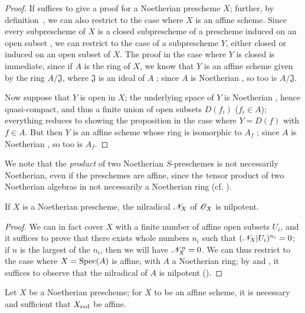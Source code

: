 \begin{proof}
\label{proof-1.6.1.4}
If suffices to give a proof for a Noetherian prescheme $X$;
further, by definition~, we can also restrict to the case where $X$ is an affine scheme.
Since every subprescheme of $X$ is a closed subprescheme of a prescheme induced on an open subset , we can restrict to the case of a subprescheme $Y$, either closed or induced on an open subset of $X$.
The proof in the case where $Y$ is closed is immediate, since if $A$ is the ring of $X$, we know that $Y$ is an affine scheme given by the ring $A/\mathfrak{J}$, where $\mathfrak{J}$ is an ideal of $A$ ;
since $A$ is Noetherian , so too is $A/\mathfrak{J}$.

Now suppose that $Y$ is open in $X$;
the underlying space of $Y$ is Noetherian , hence quasi-compact, and thus a finite union of open subsets $D(f_i)$ ($f_i\in A$);
everything reduces to showing the proposition in the case where $Y=D(f)$ with $f\in A$.
But then $Y$ is an affine scheme whose ring is isomorphic to $A_f$ ;
since $A$ is Noetherian , so too is $A_f$.
\end{proof}

\begin{env}[6.1.5]
\label{I.6.1.5}
We note that the \emph{product} of two Noetherian $S$-preschemes is not necessarily Noetherian, even if the preschemes are affine, since the tensor product of two Noetherian algebras in not necessarily a Noetherian ring (cf. ).
\end{env}

\begin{proposition}[6.1.6]
\label{I.6.1.6}
If $X$ is a Noetherian prescheme, the nilradical $\mathscr{N}_X$ of $\mathscr{O}_X$ is nilpotent.
\end{proposition}

\begin{proof}
\label{proof-1.6.1.6}
We can in fact cover $X$ with a finite number of affine open subsets $U_i$, and it suffices to prove that there exists whole numbers $n_i$ such that $(\mathscr{N}_X|U_i)^{n_i}=0$;
if $n$ is the largest of the $n_i$, then we will have $\mathscr{N}_X^n=0$.
We can thus restrict to the case where $X=\operatorname{Spec}(A)$ is affine, with $A$ a Noetherian ring;
by  and , it suffices to observe that the nilradical of $A$ is nilpotent (\cite[p.~127, cor.~4]{I-11}).
\end{proof}

\begin{corollary}[6.1.7]
\label{I.6.1.7}
Let $X$ be a Noetherian prescheme;
for $X$ to be an affine scheme, it is necessary and sufficient that $X_{\mathrm{red}}$ be affine.
\end{corollary}


